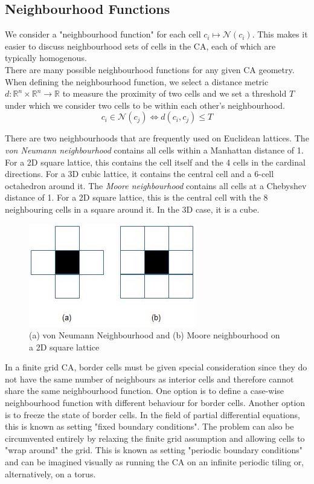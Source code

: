 \subsection{Neighbourhood Functions}
We consider a "neighbourhood function" for each cell $c_i \mapsto \mathcal{N}(c_i)$. This makes it easier to discuss neighbourhood sets of cells in the CA, each of which are typically homogenous.\\

There are many possible neighbourhood functions for any given CA geometry. When defining the neighbourhood function, we select a distance metric $d:\mathbb{R}^n \times \mathbb{R}^n \to \mathbb{R}$ to measure the proximity of two cells and we set a threshold $T$ under which we consider two cells to be within each other's neighbourhood.
\[c_i \in \mathcal{N}(c_j) \iff d(c_i, c_j) \leq T\]

There are two neighbourhoods that are frequently used on Euclidean lattices. The \textit{von Neumann neighbourhood} contains all cells within a Manhattan distance of 1. For a 2D square lattice, this contains the cell itself and the 4 cells in the cardinal directions. For a 3D cubic lattice, it contains the central cell and a 6-cell octahedron around it. The \textit{Moore neighbourhood} contains all cells at a Chebyshev distance of 1. For a 2D square lattice, this is the central cell with the 8 neighbouring cells in a square around it. In the 3D case, it is a cube.

\begin{figure}[!h]
\centering
\includegraphics[width=.3\textwidth]{images/neighbourhoods.png}
\caption{(a) von Neumann Neighbourhood and (b) Moore neighbourhood on a 2D square lattice \cite{debasis2011survey}}
\label{fig:neighbourhoods}
\end{figure}

In a finite grid CA, border cells must be given special consideration since they do not have the same number of neighbours as interior cells and therefore cannot share the same neighbourhood function. One option is to define a case-wise neighbourhood function with different behaviour for border cells. Another option is to freeze the state of border cells. In the field of partial differential equations, this is known as setting "fixed boundary conditions".  The problem can also be circumvented entirely by relaxing the finite grid assumption and allowing cells to "wrap around" the grid. This is known as setting "periodic boundary conditions" and can be imagined visually as running the CA on an infinite periodic tiling or, alternatively, on a torus.\\


